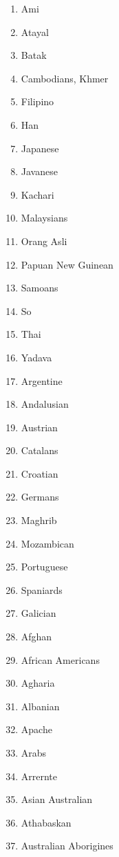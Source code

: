 {\scriptsize
    \begin{multicols}{4}
        \begin{enumerate}
            \item Ami
            \item Atayal
            \item Batak
            \item Cambodians, Khmer
            \item Filipino
            \item Han
            \item Japanese
            \item Javanese
            \item Kachari
            \item Malaysians
            \item Orang Asli
            \item Papuan New Guinean
            \item Samoans
            \item So
            \item Thai
            \item Yadava
            \item Argentine
            \item Andalusian
            \item Austrian
            \item Catalans
            \item Croatian
            \item Germans
            \item Maghrib
            \item Mozambican
            \item Portuguese
            \item Spaniards
            \item Galician
            \item Afghan
            \item African Americans
            \item Agharia
            \item Albanian
            \item Apache
            \item Arabs
            \item Arrernte
            \item Asian Australian
            \item Athabaskan
            \item Australian Aborigines

\end{enumerate}
\end{multicols}}
